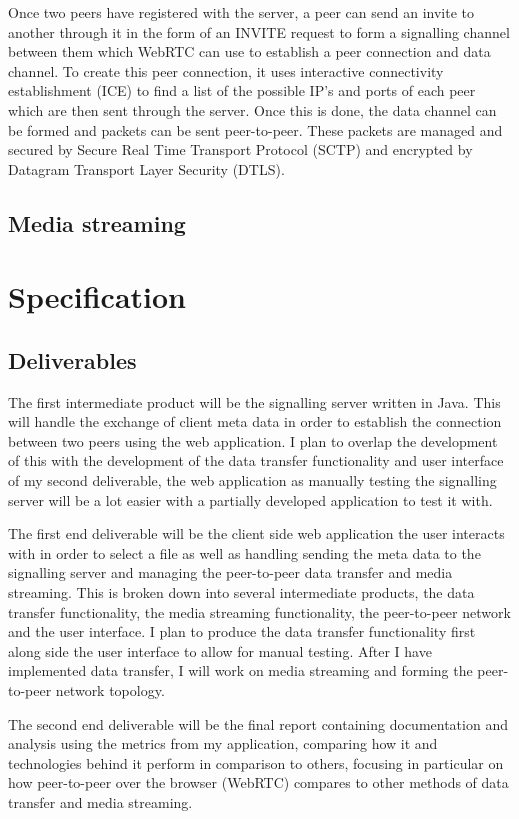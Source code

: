 \documentclass[]{report}
\begin{document}
			Once two peers have registered with the server, a peer can send an invite to another through it in the form of an INVITE request to form a signalling channel between them which WebRTC can use to establish a peer connection and data channel. To create this peer connection, it uses interactive connectivity establishment (ICE) to find a list of the possible IP's and ports of each peer which are then sent through the server. Once this is done, the data channel can be formed and packets can be sent peer-to-peer. These packets are managed and secured by Secure Real Time Transport Protocol (SCTP) and encrypted by Datagram Transport Layer Security (DTLS).
		\subsection*{Media streaming}
			
	\section{Specification}
			\subsection*{Deliverables}
			The first intermediate product will be the signalling server written in Java. This will handle the exchange of client meta data in order to establish the connection between two peers using the web application. I plan to overlap the development of this with the development of the data transfer functionality and user interface of my second deliverable, the web application as manually testing the signalling server will be a lot easier with a partially developed application to test it with.
			
			The first end deliverable will be the client side web application the user interacts with in order to select a file as well as handling sending the meta data to the signalling server and managing the peer-to-peer data transfer and media streaming. This is broken down into several intermediate products, the data transfer functionality, the media streaming functionality, the peer-to-peer network and the user interface. I plan to produce the data transfer functionality first along side the user interface to allow for manual testing. After I have implemented data transfer, I will work on media streaming and forming the peer-to-peer network topology. 
			
			The second end deliverable will be the final report containing documentation and analysis using the metrics from my application, comparing how it and technologies behind it perform in comparison to others, focusing in particular on how peer-to-peer over the browser (WebRTC) compares to other methods of data transfer and media streaming.
			
\end{document}
